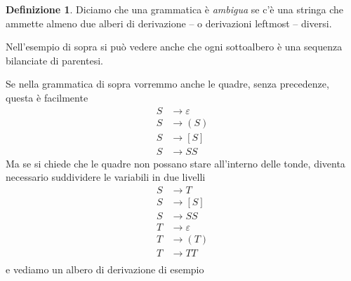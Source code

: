\documentclass[12pt]{report}
\theoremstyle{definition}
\newtheorem{definizione}{Definizione}
\begin{document}
\begin{definizione}
Diciamo che una grammatica è \textit{ambigua} se c'è una stringa che ammette almeno due alberi di derivazione -- o derivazioni leftmost -- diversi.
\end{definizione}

Nell'esempio di sopra si può vedere anche che ogni sottoalbero è una sequenza bilanciate di parentesi.

\begin{tcolorbox} %
Se nella grammatica di sopra vorremmo anche le quadre, senza precedenze, questa è facilmente
\begin{align*}
 	S &\rightarrow \varepsilon \\
 	S &\rightarrow ( S ) \\
 	S &\rightarrow [ S ] \\
 	S &\rightarrow S S
\end{align*}
Ma se si chiede che le quadre non possano stare all'interno delle tonde, diventa necessario suddividere le variabili in due livelli
\begin{align*}
 	S &\rightarrow T \\
 	S &\rightarrow [ S ] \\
 	S &\rightarrow S S \\
 	T &\rightarrow \varepsilon \\
 	T &\rightarrow ( T ) \\
 	T &\rightarrow T T \\
\end{align*}
e vediamo un albero di derivazione di esempio
\begin{center}
\end{center}
\end{tcolorbox}
\end{document}
